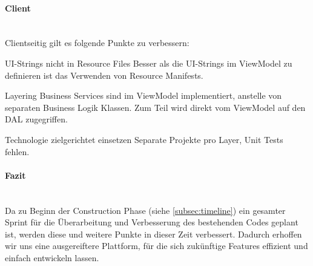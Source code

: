 \paragraph{Client}~\\
Clientseitig gilt es folgende Punkte zu verbessern:
\begin{basedescript}{
	\desclabelstyle{\multilinelabel}
	\desclabelwidth{4.5cm}
	\setlength{\itemsep}{5ex}}
\item[UI-Strings nicht in Resource Files] Besser als die UI-Strings im ViewModel zu definieren ist das Verwenden von Resource Manifests.
\item[Layering] Business Services sind im ViewModel implementiert, anstelle von separaten Business Logik Klassen. Zum Teil wird direkt vom ViewModel auf den DAL zugegriffen.
\item[Technologie zielgerichtet einsetzen] Separate Projekte pro Layer, Unit Tests fehlen.
\end{basedescript}
\vspace{0.5cm}
\paragraph{Fazit}~\\
Da zu Beginn der Construction Phase (siehe \ref{subsec:timeline}) ein gesamter Sprint für die Überarbeitung und Verbesserung des bestehenden Codes geplant ist, werden diese und weitere Punkte in dieser Zeit verbessert. Dadurch erhoffen wir uns eine ausgereiftere Plattform, für die sich zukünftige Features effizient und einfach entwickeln lassen. 